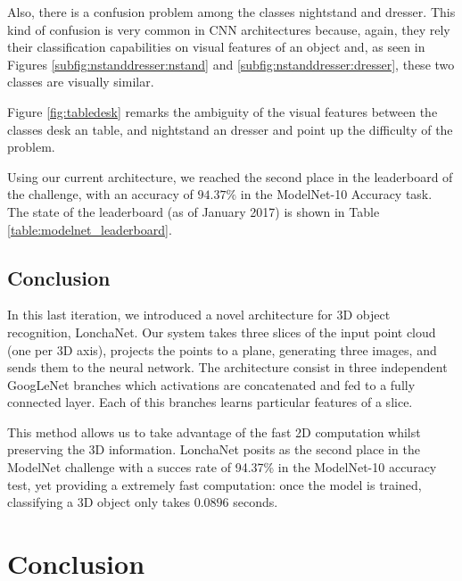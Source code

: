 Also, there is a confusion problem among the classes nightstand and dresser. This kind of confusion is very common in \acs{CNN} architectures because, again, they rely their classification capabilities on visual features of an object and, as seen in Figures \ref{subfig:nstanddresser:nstand} and \ref{subfig:nstanddresser:dresser}, these two classes are visually similar.

Figure \ref{fig:tabledesk} remarks the ambiguity of the visual features between the classes desk an table, and nightstand an dresser and point up the difficulty of the problem.

Using our current architecture, we reached the second place in the leaderboard of the challenge, with an accuracy of $94.37\%$ in the ModelNet-10 Accuracy task. The state of the leaderboard (as of January 2017) is shown in Table \ref{table:modelnet_leaderboard}.

\subsection{Conclusion}
\label{cha:objrecog:sec:lonchanet:subsec:conclusion}

In this last iteration, we introduced a novel architecture for 3D object recognition, LonchaNet. Our system takes three slices of the input point cloud (one per 3D axis), projects the points to a plane, generating three images, and sends them to the neural network. The architecture consist in three independent GoogLeNet branches which activations are concatenated and fed to a fully connected layer. Each of this branches learns particular features of a slice.

This method allows us to take advantage of the fast 2D computation whilst preserving the 3D information. LonchaNet posits as the second place in the ModelNet challenge with a succes rate of 94.37\% in the ModelNet-10 accuracy test, yet providing a extremely fast computation: once the model is trained, classifying a 3D object only takes $0.0896$ seconds.

\section{Conclusion}
\label{cha:objrecog:sec:conclusion}

